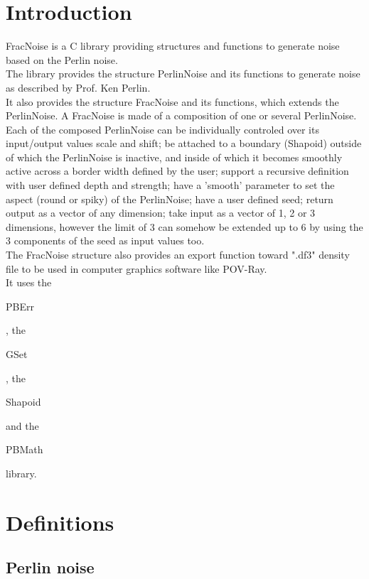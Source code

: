 \section*{Introduction}

FracNoise is a C library providing structures and functions to generate noise based on the Perlin noise.\\ 

The library provides the structure PerlinNoise and its functions to generate noise as described by Prof. Ken Perlin.\\

It also provides the structure FracNoise and its functions, which extends the PerlinNoise. A FracNoise is made of a composition of one or several PerlinNoise. Each of the composed PerlinNoise can be individually controled over its input/output values scale and shift; be attached to a boundary (Shapoid) outside of which the PerlinNoise is inactive, and inside of which it becomes smoothly active across a border width defined by the user; support a recursive definition with user defined depth and strength; have a 'smooth' parameter to set the aspect (round or spiky) of the PerlinNoise; have a user defined seed; return output as a vector of any dimension; take input as a vector of 1, 2 or 3 dimensions, however the limit of 3 can somehow be extended up to 6 by using the 3 components of the seed as input values too.\\

The FracNoise structure also provides an export function toward ".df3" density file to be used in computer graphics software like POV-Ray.\\ 

It uses the \begin{ttfamily}PBErr\end{ttfamily}, the \begin{ttfamily}GSet\end{ttfamily}, the \begin{ttfamily}Shapoid\end{ttfamily} and the \begin{ttfamily}PBMath\end{ttfamily} library.\\

\section{Definitions}

\subsection{Perlin noise}

